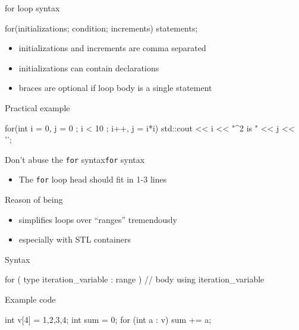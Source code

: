 \begin{frame}[fragile]
  \begin{block}{for loop syntax}
    \begin{cppcode*}{}
      for(initializations; condition; increments) {
        statements;
      }
    \end{cppcode*}
    \vspace{-0.2cm}
    \begin{itemize}
      \item initializations and increments are comma separated
      \item initializations can contain declarations
      \item braces are optional if loop body is a single statement
    \end{itemize}
  \end{block}
  \pause
  \begin{exampleblock}{Practical example}
    \begin{cppcode*}{}
      for(int i = 0, j = 0 ; i < 10 ; i++, j = i*i) {
        std::cout << i << "^2 is " << j << '\n';
      }
    \end{cppcode*}
  \end{exampleblock}
  \pause
  \begin{goodpracticeWithShortcut}{Don't abuse the \texttt{for} syntax}{\texttt{for} syntax}
    \begin{itemize}
      \item The \texttt{for} loop head should fit in 1-3 lines
    \end{itemize}
  \end{goodpracticeWithShortcut}
\end{frame}

\begin{frame}[fragile]
  \begin{block}{Reason of being}
    \begin{itemize}
    \item simplifies loops over ``ranges'' tremendously
    \item especially with STL containers
    \end{itemize}
  \end{block}
  \begin{block}{Syntax}
    \begin{cppcode*}{}
      for ( type iteration_variable : range ) {
        // body using iteration_variable
      }
    \end{cppcode*}
  \end{block}
  \begin{exampleblock}{Example code}
    \begin{cppcode*}{}
      int v[4] = {1,2,3,4};
      int sum = 0;
      for (int a : v) { sum += a; }
    \end{cppcode*}
  \end{exampleblock}
\end{frame}

